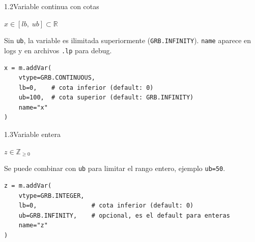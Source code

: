 \documentclass[10pt,a4paper]{article}
\newlength{\mathcolw}
\newlength{\codecolw}
\newcommand{\entryheader}[1]{%
  \needspace{5cm}%
  \vspace{6pt}%
  \noindent%
  \begin{tcolorbox}[
    colback=subsecbg!18,
    colframe=subsecbg!45,
    sharp corners, boxrule=0.4pt,
    left=5pt, right=5pt, top=2pt, bottom=2pt,
    fontupper=\small\bfseries\sffamily,
  ]
  #1
  \end{tcolorbox}%
  \vspace{2pt}%
}
\newcommand{\py}[1]{\texttt{\small #1}}
\begin{document}
\vspace{4pt}

\entryheader{1.2\quad Variable continua con cotas}
\noindent
\begin{minipage}[t]{\mathcolw}
    \begin{tcolorbox}[mathbox]
        $x \in [lb,\; ub] \subset \mathbb{R}$
    \end{tcolorbox}
    \vspace{2pt}
    \begin{tcolorbox}[notebox]
        Sin \py{ub}, la variable es ilimitada superiormente (\py{GRB.INFINITY}). \py{name} aparece en logs y en archivos \py{.lp} para debug.
    \end{tcolorbox}
\end{minipage}\hspace{0.02\textwidth}%
\begin{minipage}[t]{\codecolw}
    \begin{lstlisting}[style=gurobipy]
x = m.addVar(
    vtype=GRB.CONTINUOUS,
    lb=0,    # cota inferior (default: 0)
    ub=100,  # cota superior (default: GRB.INFINITY)
    name="x"
)
    \end{lstlisting}
\end{minipage}

\vspace{4pt}

\entryheader{1.3\quad Variable entera}
\noindent
\begin{minipage}[t]{\mathcolw}
    \begin{tcolorbox}[mathbox]
        $z \in \mathbb{Z}_{\geq 0}$
    \end{tcolorbox}
    \vspace{2pt}
    \begin{tcolorbox}[notebox]
        Se puede combinar con \py{ub} para limitar el rango entero, ejemplo \py{ub=50}.
    \end{tcolorbox}
\end{minipage}\hspace{0.02\textwidth}%
\begin{minipage}[t]{\codecolw}
    \begin{lstlisting}[style=gurobipy]
z = m.addVar(
    vtype=GRB.INTEGER,
    lb=0,               # cota inferior (default: 0)
    ub=GRB.INFINITY,    # opcional, es el default para enteras
    name="z"
)
\end{lstlisting}
\end{minipage}

\vspace{4pt}
\end{document}
